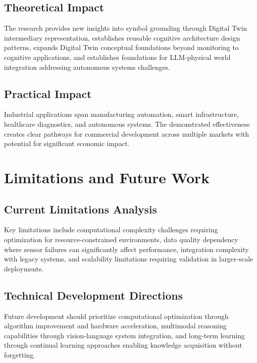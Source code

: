 \subsection{Theoretical Impact}

The research provides new insights into symbol grounding through Digital Twin intermediary representation, establishes reusable cognitive architecture design patterns, expands Digital Twin conceptual foundations beyond monitoring to cognitive applications, and establishes foundations for LLM-physical world integration addressing autonomous systems challenges.

\subsection{Practical Impact}

Industrial applications span manufacturing automation, smart infrastructure, healthcare diagnostics, and autonomous systems. The demonstrated effectiveness creates clear pathways for commercial development across multiple markets with potential for significant economic impact.

\section{Limitations and Future Work}

\subsection{Current Limitations Analysis}

Key limitations include computational complexity challenges requiring optimization for resource-constrained environments, data quality dependency where sensor failures can significantly affect performance, integration complexity with legacy systems, and scalability limitations requiring validation in larger-scale deployments.

\subsection{Technical Development Directions}

Future development should prioritize computational optimization through algorithm improvement and hardware acceleration, multimodal reasoning capabilities through vision-language system integration, and long-term learning through continual learning approaches enabling knowledge acquisition without forgetting.

